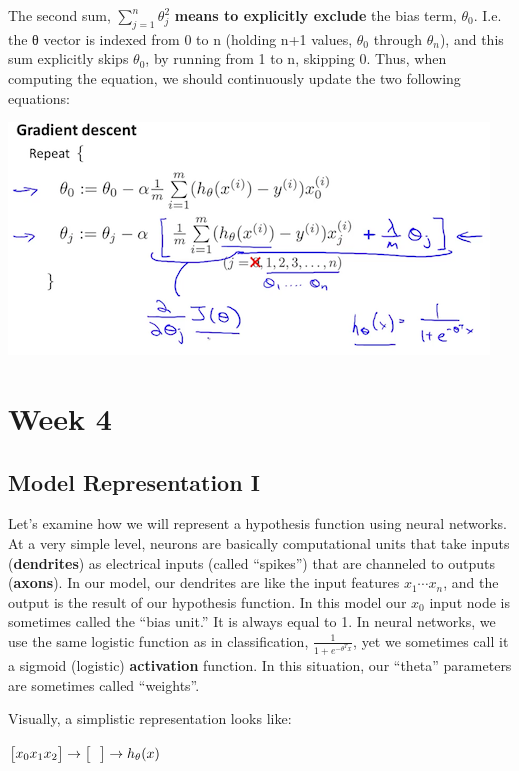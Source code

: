 \documentclass[
]{article}
\begin{document}
The second sum, \(\sum_{j=1}^n \theta_j^2\) \textbf{means to explicitly
exclude} the bias term, \(\theta_0\). I.e. the θ vector is indexed from
0 to n (holding n+1 values, \(\theta_0\) through \(\theta_n\)), and this
sum explicitly skips \(\theta_0\), by running from 1 to n, skipping 0.
Thus, when computing the equation, we should continuously update the two
following equations:

\includegraphics{RegLogReg2.png}

\hypertarget{week-4}{%
\section{Week 4}\label{week-4}}

\hypertarget{model-representation-i}{%
\subsection{Model Representation I}\label{model-representation-i}}

Let's examine how we will represent a hypothesis function using neural
networks. At a very simple level, neurons are basically computational
units that take inputs (\textbf{dendrites}) as electrical inputs (called
``spikes'') that are channeled to outputs (\textbf{axons}). In our
model, our dendrites are like the input features \(x_1\cdots x_n\), and
the output is the result of our hypothesis function. In this model our
\(x_0\) input node is sometimes called the ``bias unit.'' It is always
equal to 1. In neural networks, we use the same logistic function as in
classification, \(\frac{1}{1 + e^{-\theta^Tx}}\), yet we sometimes call
it a sigmoid (logistic) \textbf{activation} function. In this situation,
our ``theta'' parameters are sometimes called ``weights''.

Visually, a simplistic representation looks like:

\(\begin{bmatrix}x_0 \newline x_1 \newline x_2 \newline \end{bmatrix}\rightarrow\begin{bmatrix}\ \ \ \newline \end{bmatrix}\rightarrow h_\theta(x)\)
\end{document}
